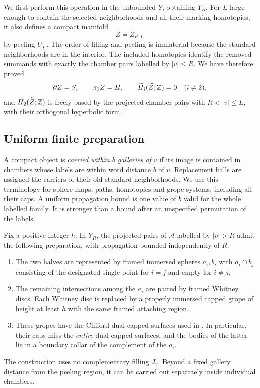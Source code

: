 We first perform this operation in the unbounded $Y$, obtaining $Y_R$.
For $L$ large enough to contain the selected neighborhoods and all their
marking homotopies, it also defines a compact manifold
\[
                        Z=Z_{R,L}
\]
by peeling $U_L^+$.  The order of filling and peeling is immaterial
because the standard neighborhoods are in the interior.  The included
homotopies identify the removed summands with exactly the chamber pairs
labelled by $|v|\leq R$.  We have therefore proved
\begin{equation}\label{ct:Z-homology}
 \partial Z=S,\qquad \pi_1 Z=H,\qquad
 \widetilde H_i(\widetilde Z;\mathbb Z)=0\quad(i\ne2),
\end{equation}
and $H_2(\widetilde Z;\mathbb Z)$ is freely based by the projected chamber
pairs with $R<|v|\leq L$, with their orthogonal hyperbolic form.

\subsection{Uniform finite preparation}

A compact object is \emph{carried within $b$ galleries of $v$} if its
image is contained in chambers whose labels are within word distance
$b$ of $v$.  Replacement balls are assigned the carriers of their old
standard neighborhoods.  We use this terminology for sphere maps,
paths, homotopies and grope systems, including all their caps.  A
uniform propagation bound is one value of $b$ valid for the whole
labelled family.  It is stronger than a bound after an unspecified
permutation of the labels.

\begin{lemma}\label{ct:preparation}
Fix a positive integer $h$.  In $Y_R$, the projected pairs of
$\mathcal A$ labelled by $|v|>R$ admit the following preparation, with
propagation bounded independently of $R$:
\begin{enumerate}
\item The two halves are represented by framed immersed spheres
      $a_i,b_i$ with $a_i\cap b_j$ consisting of the designated single
      point for $i=j$ and empty for $i\ne j$.
\item The remaining intersections among the $a_i$ are paired by
      framed Whitney discs.  Each Whitney disc is replaced by a
      properly immersed capped grope of height at least $h$ with the
      same framed attaching region.
\item These gropes have the Clifford dual capped surfaces used in
      \cite[Definition~3.1 and Lemma~4.1]{PRT}.  In particular, their
      caps miss the \emph{entire} dual capped surfaces, and the bodies
      of the latter lie in a boundary collar of the complement of the
      $a_i$.
\end{enumerate}
The construction uses no complementary filling $J_v$.  Beyond a fixed
gallery distance from the peeling region, it can be carried out
separately inside individual chambers.
\end{lemma}

